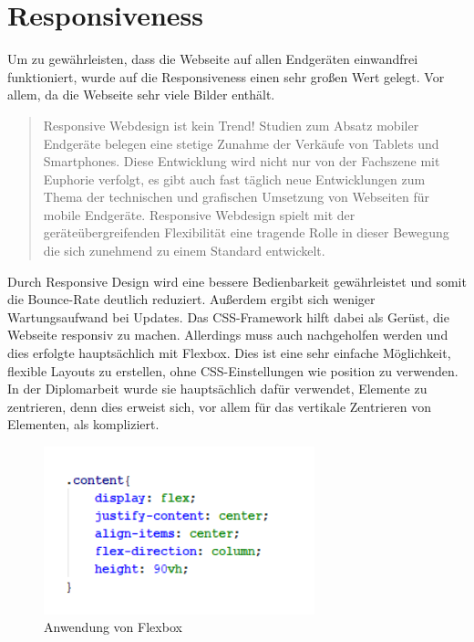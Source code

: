 \section{Responsiveness}
Um zu gewährleisten, dass die Webseite auf allen Endgeräten einwandfrei funktioniert, wurde auf die Responsiveness einen sehr großen Wert gelegt. Vor allem, da die Webseite sehr viele Bilder enthält.

\begin{quote}
Responsive Webdesign ist kein Trend! Studien zum Absatz mobiler Endgeräte belegen eine stetige Zunahme der Verkäufe von Tablets und Smartphones. Diese Entwicklung wird nicht nur von der Fachszene mit Euphorie verfolgt, es gibt auch fast täglich neue Entwicklungen zum Thema der technischen und grafischen Umsetzung von Webseiten für mobile Endgeräte. Responsive Webdesign spielt mit der geräteübergreifenden Flexibilität eine tragende Rolle in dieser Bewegung die sich zunehmend zu einem Standard entwickelt. 
\end{quote}

Durch Responsive Design wird eine bessere Bedienbarkeit gewährleistet und somit die Bounce-Rate deutlich reduziert. Außerdem ergibt sich weniger Wartungsaufwand bei Updates.  Das CSS-Framework hilft dabei als Gerüst, die Webseite responsiv zu machen. Allerdings muss auch nachgeholfen werden und dies erfolgte hauptsächlich mit Flexbox. Dies ist eine sehr einfache Möglichkeit, flexible Layouts zu erstellen, ohne CSS-Einstellungen wie position zu verwenden. In der Diplomarbeit wurde sie hauptsächlich dafür verwendet, Elemente zu zentrieren, denn dies erweist sich, vor allem für das vertikale Zentrieren von Elementen, als kompliziert. 

\begin{figure}[H] 
  \centering
     \includegraphics[width=0.7\textwidth]{webseite_abb2.png}
  \caption{Anwendung von Flexbox}

\end{figure}

